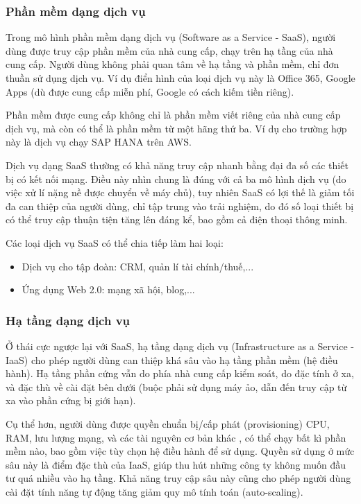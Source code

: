 \documentclass{article}
\begin{document}
\subsubsection{Phần mềm dạng dịch vụ}

Trong mô hình phần mềm dạng dịch vụ (Software as a Service - SaaS), người dùng
được truy cập phần mềm của nhà cung cấp, chạy trên hạ tầng của nhà cung cấp.
Người dùng không phải quan tâm về hạ tầng và phần mềm, chỉ đơn thuần sử dụng
dịch vụ. Ví dụ điển hình của loại dịch vụ này là Office 365, Google Apps (dù
được cung cấp miễn phí, Google có cách kiếm tiền riêng).

Phần mềm được cung cấp không chỉ là phần mềm viết riêng của nhà cung cấp dịch
vụ, mà còn có thể là phần mềm từ một hãng thứ ba. Ví dụ cho trường hợp này là
dịch vụ chạy SAP HANA trên AWS.

Dịch vụ dạng SaaS thường có khả năng truy cập nhanh bằng đại đa số các thiết bị
có kết nối mạng. Điều này nhìn chung là đúng với cả ba mô hình dịch vụ (do việc
xử lí nặng nề được chuyển về máy chủ), tuy nhiên SaaS có lợi thế là giảm tối đa
can thiệp của người dùng, chỉ tập trung vào trải nghiệm, do đó số loại thiết bị
có thể truy cập thuận tiện tăng lên đáng kể, bao gồm cả điện thoại thông minh.

Các loại dịch vụ SaaS có thể chia tiếp làm hai loại:

\begin{itemize}
    \item Dịch vụ cho tập đoàn: CRM, quản lí tài chính/thuế,...
    \item Ứng dụng Web 2.0: mạng xã hội, blog,...
\end{itemize}

\subsubsection{Hạ tầng dạng dịch vụ}

Ở thái cực ngược lại với SaaS, hạ tầng dạng dịch vụ (Infrastructure as a Service
- IaaS) cho phép người dùng can thiệp khá sâu vào hạ tầng phần mềm (hệ điều
hành). Hạ tầng phần cứng vẫn do phía nhà cung cấp kiểm soát, do đặc tính ở xa,
và đặc thù về cài đặt bên dưới (buộc phải sử dụng máy ảo, dẫn đến truy cập từ xa
vào phần cứng bị giới hạn).

Cụ thể hơn, người dùng được quyền chuẩn bị/cấp phát (provisioning) CPU, RAM, lưu
lượng mạng, và các tài nguyên cơ bản khác \cite{MARINESCU201813}, có thể chạy
bất kì phần mềm nào, bao gồm việc tùy chọn hệ điều hành để sử dụng. Quyền sử
dụng ở mức sâu này là điểm đặc thù của IaaS, giúp thu hút những công ty không
muốn đầu tư quá nhiều vào hạ tầng. Khả năng truy cập sâu này cũng cho phép người
dùng cài đặt tính năng tự động tăng giảm quy mô tính toán (auto-scaling).
\end{document}
